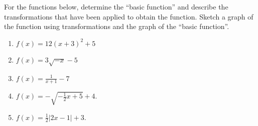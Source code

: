 \documentclass{ximera}
\begin{document}
\begin{exercise} For the functions below, determine the ``basic function'' and describe the transformations that have been applied to obtain the function. Sketch a graph of the function using transformations and the graph of the ``basic function''.
\begin{enumerate}
\item $f(x)=12(x+3)^2+5$
\item $f(x)=3\sqrt{-x}-5$
\item $f(x)=\frac{1}{x+1}-7$
\item $f(x)=-\sqrt{-\frac{1}{2}x+5}+4$.
\item $\displaystyle f(x)=\frac{1}{2}|2x-1|+3$.
\end{enumerate}
\end{exercise}
\end{document}
